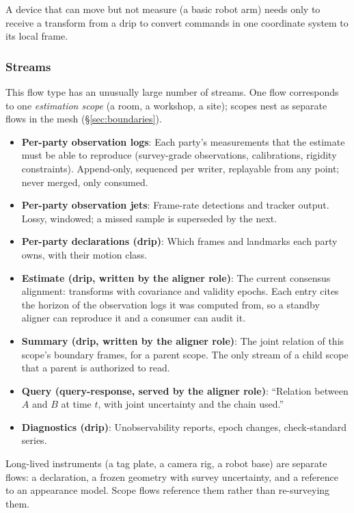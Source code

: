 \documentclass[11pt, letterpaper]{article}
\begin{document}
A device that can move but not measure (a basic robot arm) needs only to receive a
transform from a drip to convert commands in one coordinate system to its local frame.

\subsubsection{Streams}

This flow type has an unusually large number of streams. One flow corresponds to one
\emph{estimation scope} (a room, a workshop, a site); scopes nest as separate flows
in the mesh (\S\ref{sec:boundaries}).

\begin{itemize}[leftmargin=2em]
  \item \textbf{Per-party observation logs}: Each party's measurements that the
    estimate must be able to reproduce (survey-grade observations, calibrations,
    rigidity constraints). Append-only, sequenced per writer, replayable from any
    point; never merged, only consumed.
  \item \textbf{Per-party observation jets}: Frame-rate detections and tracker output.
    Lossy, windowed; a missed sample is superseded by the next.
  \item \textbf{Per-party declarations (drip)}: Which frames and landmarks each party
    owns, with their motion class.
  \item \textbf{Estimate (drip, written by the aligner role)}: The current consensus
    alignment: transforms with covariance and validity epochs. Each entry cites the
    horizon of the observation logs it was computed from, so a standby aligner can
    reproduce it and a consumer can audit it.
  \item \textbf{Summary (drip, written by the aligner role)}: The joint relation of this
    scope's boundary frames, for a parent scope. The only stream of a child scope that a
    parent is authorized to read.
  \item \textbf{Query (query-response, served by the aligner role)}: ``Relation between
    $A$ and $B$ at time $t$, with joint uncertainty and the chain used.''
  \item \textbf{Diagnostics (drip)}: Unobservability reports, epoch changes,
    check-standard series.
\end{itemize}

Long-lived instruments (a tag plate, a camera rig, a robot base) are separate flows:
a declaration, a frozen geometry with survey uncertainty, and a reference to an
appearance model. Scope flows reference them rather than re-surveying them.
\end{document}
